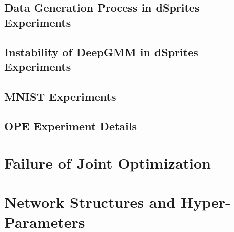 \documentclass{article}
\begin{document}
\subsection{Data Generation Process in dSprites Experiments}
 \label{sec:data-generation-process-dsprite}
\subsection{Instability of DeepGMM in dSprites Experiments}
 \label{sec:deep-gmm-instability}
\subsection{MNIST Experiments}
 \label{sec:mnist_experiment}
\subsection{OPE Experiment Details}
 \label{sec:ope_experiment_details}

\section{Failure of Joint Optimization} \label{sec:joint}


\newpage
\section{Network Structures and Hyper-Parameters} \label{sec:net-and-hypers}

\end{document}
